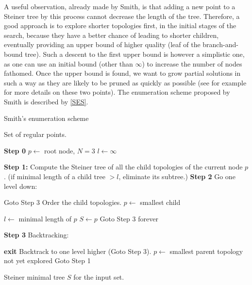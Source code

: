 \documentclass{article}
\theoremstyle{plain}
\begin{document}
A useful observation, already made by Smith, is that adding a new point to a Steiner tree by this process cannot decrease the length of the tree. 
Therefore, a good approach is to explore shorter topologies first, in the initial stages of the search, because they have a better chance of leading to shorter children, eventually providing an upper bound of higher quality (leaf of the branch-and-bound tree). 
Such a descent to the first upper bound is however a simplistic one, as one can use an initial bound (other than $\infty$) to increase the number of nodes fathomed. 
Once the upper bound is found, we want to grow partial solutions in such a way as they are likely to be pruned as quickly as possible (see for example \cite{Fonseca} for more details on these two points).
The enumeration scheme proposed by Smith is described by \cref{SES}. 

\begin{algorithm}
\renewcommand{\algorithmicrequire}{\textbf{Input:}}
\renewcommand{\algorithmicensure}{\textbf{Output:}}

\caption{Smith's enumeration scheme \protect\cite{Smith}} 
\label{SES}

\begin{algorithmic}[1]
\Require Set of regular points.
\Statex\hrulefill
\begin{spacing}{1.2}
\Statex \textbf{Step 0} $p \gets$ root node, $N = 3$
\State $l \gets \infty$

\Repeat
	\Statex \Comment \textbf{Step 1:}
	\State Compute the Steiner tree of all the child topologies of the current node $p$. 
	\State (if minimal length of a child tree $> l$, eliminate its subtree.)
	\Statex \Comment \textbf{Step 2} Go one level down:

		\State Goto Step 3
	\Else
			\State Order the child topologies.
			\State $p \gets$ smallest child
			
		\Else 
				\State $l \gets$ minimal length of $p$ 
				\State $S \gets p$
				\EndIf
			\EndFor
			\State Goto Step 3
		\EndIf
	\EndIf
\Until forever

\Statex \Comment \textbf{Step 3} Backtracking:

		\State \textbf{exit}
	\Else
		\State Backtrack to one level higher (Goto Step 3).
	\EndIf
\Else
\State $p \gets$ smallest parent topology not yet explored
\State Goto Step 1
\EndIf

\end{spacing}
\hrulefill
\Ensure Steiner minimal tree $S$ for the input set.

\end{algorithmic}
\end{algorithm}
\end{document}
